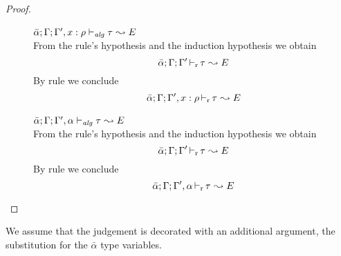 \begin{proof}
\begin{description}
\item[]\quad$\bar{\alpha};\Gamma;\Gamma',x:\rho \vdash_{\mathit{alg}} \tau~{\leadsto E}$ \ \\
From the rule's hypothesis and the induction hypothesis we obtain
\begin{equation*}
  \bar{\alpha};\Gamma;\Gamma' \mathop{\vdash_{\mathrm{r}}} \tau~{\leadsto E}
\end{equation*}
By rule  we conclude
\begin{equation*}
  \bar{\alpha};\Gamma;\Gamma',x:\rho \mathop{\vdash_{\mathrm{r}}} \tau~{\leadsto E}
\end{equation*}

\item[]\quad$\bar{\alpha};\Gamma;\Gamma',\alpha \vdash_{\mathit{alg}} \tau~{\leadsto E}$ \ \\
From the rule's hypothesis and the induction hypothesis we obtain
\begin{equation*}
  \bar{\alpha};\Gamma;\Gamma' \mathop{\vdash_{\mathrm{r}}} \tau~{\leadsto E}
\end{equation*}
By rule  we conclude
\begin{equation*}
  \bar{\alpha};\Gamma;\Gamma',\alpha \mathop{\vdash_{\mathrm{r}}} \tau~{\leadsto E}
\end{equation*}

\end{description}
\end{proof}

We assume that the judgement is decorated with an additional argument, the substitution
for the $\bar{\alpha}$ type variables.

{\centering
{}}

